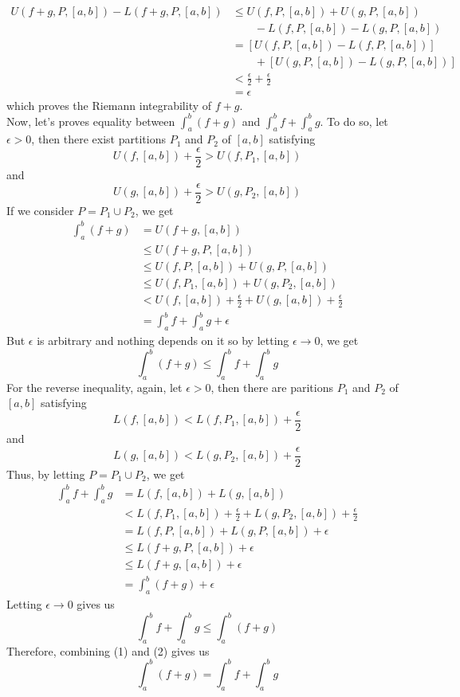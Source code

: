 \begin{solution}
\begin{align*}
        U(f+g, P, [a,b]) - L(f+g, P, [a,b]) 
        &\leq U(f, P, [a,b]) + U(g, P, [a,b]) \\ 
        & \qquad - L(f, P, [a,b]) - L(g, P, [a,b]) \\
        &= \left[U(f, P, [a,b]) - L(f, P, [a,b])\right] \\
        & \qquad + \left[U(g, P, [a,b]) - L(g, P, [a,b])\right] \\
        &< \frac{\epsilon}{2} + \frac{\epsilon}{2} \\
        &= \epsilon
    \end{align*}
    which proves the Riemann integrability of $f+g$. \\
    Now, let's proves equality between $\int_{a}^{b}(f+g)$ and $\int_{a}^{b}f + \int_{a}^{b}g$. To do so, let $\epsilon > 0$, then there exist partitions $P_1$ and $P_2$ of $[a,b]$ satisfying
    $$U(f, [a,b]) + \frac{\epsilon}{2} > U(f, P_1, [a,b])$$
    and 
    $$U(g, [a,b]) + \frac{\epsilon}{2} > U(g, P_2, [a,b])$$
    If we consider $P = P_1 \cup P_2$, we get
    \begin{align*}
        \int_{a}^{b}(f+g) &= U(f+g, [a,b]) \\
        &\leq U(f+g, P, [a,b]) \\
        &\leq U(f, P, [a,b]) + U(g, P, [a,b]) \\
        &\leq U(f, P_1, [a,b]) + U(g, P_2, [a,b]) \\
        &< U(f, [a,b]) + \frac{\epsilon}{2} + U(g, [a,b]) + \frac{\epsilon}{2}\\
        &= \int_{a}^{b}f + \int_{a}^{b}g + \epsilon
    \end{align*}
    But $\epsilon$ is arbitrary and nothing depends on it so by letting $\epsilon \rightarrow 0$, we get
    \[\int_{a}^{b}(f+g) \leq \int_{a}^{b}f + \int_{a}^{b}g \tag*{(1)}\]
    For the reverse inequality, again, let $\epsilon > 0$, then there are paritions $P_1$ and $P_2$ of $[a,b]$ satisfying 
    $$L(f, [a,b]) < L(f, P_1, [a,b]) + \frac{\epsilon}{2}$$
    and 
    $$L(g, [a,b]) < L(g, P_2, [a,b]) + \frac{\epsilon}{2}$$
    Thus, by letting $P = P_1 \cup P_2$, we get
    \begin{align*}
        \int_{a}^{b}f + \int_{a}^{b}g &= L(f, [a,b]) + L(g, [a,b]) \\
        &< L(f, P_1, [a,b]) + \frac{\epsilon}{2} + L(g, P_2, [a,b]) + \frac{\epsilon}{2} \\
        &= L(f, P, [a,b]) + L(g, P, [a,b]) + \epsilon \\
        &\leq L(f + g, P, [a,b]) + \epsilon \\
        &\leq L(f + g, [a,b]) + \epsilon \\
        &= \int_{a}^{b}(f+g) + \epsilon
    \end{align*}
    Letting $\epsilon \rightarrow 0$ gives us 
    \[\int_{a}^{b}f + \int_{a}^{b}g \leq \int_{a}^{b}(f+g) \tag*{(2)}\]
    Therefore, combining (1) and (2) gives us
    $$\int_{a}^{b}(f+g) = \int_{a}^{b}f + \int_{a}^{b}g$$\\
\end{solution}

